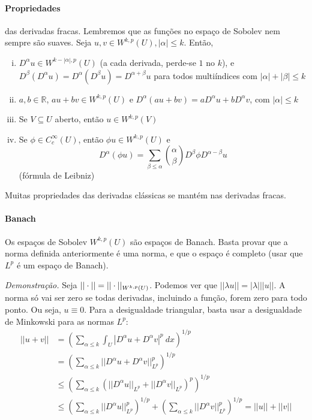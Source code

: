 \documentclass[a4paper, 11pt]{article}
\newcommand{\R}{\mathbb{R}}
\begin{document}
\paragraph{Propriedades} das derivadas fracas. Lembremos que as funções no espaço de Sobolev nem sempre são suaves. Seja \( u,v \in W^{k,p}(U), |\alpha| \leq k \). Então, \begin{enumerate}[(i)]
	\item \( D^\alpha u \in W^{k-|\alpha|, p}(U) \) (a cada derivada, perde-se \( 1 \) no \( k \)), e\\ \( D^\beta(D^\alpha u)=D^\alpha(D^\beta u) = D^{\alpha + \beta}u \) para todos multiíndices com \( |\alpha|+ |\beta| \leq k \)
	\item \(a, b \in \R \), \( au + bv \in W^{k,p}(U) \) e \( D^\alpha(au +bv) = aD^\alpha u + bD^\alpha v \), com \( |\alpha|\leq k \)
	\item Se \( V \subseteq U \) aberto, então \( u \in W^{k,p}(V) \)
	\item Se \( \phi \in C^\infty_c(U) \), então \( \phi u \in W^{k,p}(U) \) e \[ D^\alpha(\phi u) = \sum_{\beta \leq \alpha} \binom{\alpha}{\beta} D^\beta \phi D^{\alpha - \beta}u \] (fórmula de Leibniz)
\end{enumerate}

Muitas propriedades das derivadas clássicas se mantém nas derivadas fracas.

\paragraph{Banach} Os espaços de Sobolev \( W^{k,p}(U) \) são espaços de Banach. Basta provar que a norma definida anteriormente é uma norma, e que o espaço é completo (usar que \( L^p \) é um espaço de Banach).

\textit{Demonstração.} Seja \( || \cdot ||= ||\cdot ||_{W^{k,p}(U)} \). Podemos ver que \( ||\lambda u|| = |\lambda| ||u|| \). A norma só vai ser zero se todas derivadas, incluindo a função, forem zero para todo ponto. Ou seja, \( u \equiv 0 \). Para a desigualdade triangular, basta usar a desigualdade de Minkowski para as normas \( L^p \): \begin{align*}
	||u+v|| &= \left( \sum_{\alpha \leq k}\int_U | D^\alpha u + D^\alpha v |^p\ dx \right)^{1/p} \\
	&= \left( \sum_{\alpha \leq k} ||D^\alpha u+D^\alpha v||_{L^p}^p \right)^{1/p}\\
	&\leq  \left( \sum_{\alpha \leq k} (||D^\alpha u||_{L^p}+||D^\alpha v||_{L^p})^p \right)^{1/p}\\
	&\leq  \left( \sum_{\alpha \leq k} ||D^\alpha u||_{L^p}^p \right)^{1/p}+\left( \sum_{\alpha\leq k} ||D^\alpha v||_{L^p}^p \right)^{1/p} = ||u|| + ||v||
\end{align*}
\end{document}
